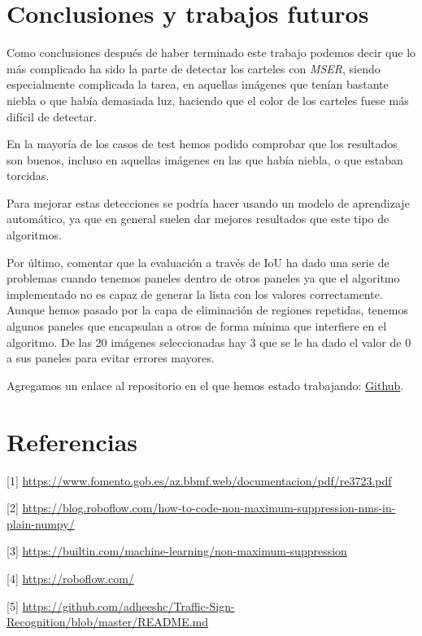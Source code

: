 \documentclass[a4paper, 12pt]{article}
\begin{document}
\section{Conclusiones y trabajos futuros}
Como conclusiones después de haber terminado este trabajo podemos decir que lo más complicado ha sido la parte de detectar los carteles con \textit{MSER}, siendo especialmente complicada la tarea, en aquellas imágenes que tenían bastante niebla o que había demasiada luz, haciendo que el color de los carteles fuese más difícil de detectar. 

En la mayoría de los casos de test hemos podido comprobar que los resultados son buenos, incluso en aquellas imágenes en las que había niebla, o que estaban torcidas.

Para mejorar estas detecciones se podría hacer usando un modelo de aprendizaje automático, ya que en general suelen dar mejores resultados que este tipo de algoritmos. 

Por último, comentar que la evaluación a través de IoU ha dado una serie de problemas cuando tenemos paneles dentro de otros paneles ya que el algoritmo implementado no es capaz de generar la lista con los valores correctamente. Aunque hemos pasado por la capa de eliminación de regiones repetidas, tenemos algunos paneles que encapsulan a otros de forma mínima que interfiere en el algoritmo. De las 20 imágenes seleccionadas hay 3 que se le ha dado el valor de 0 a sus paneles para evitar errores mayores.

Agregamos un enlace al repositorio en el que hemos estado trabajando: \href{https://github.com/Im-Lewis/Practica1-VA}{Github}.

\section{Referencias}
[1] \href{https://www.fomento.gob.es/az.bbmf.web/documentacion/pdf/re3723.pdf}{https://www.fomento.gob.es/az.bbmf.web/documentacion/pdf/re3723.pdf}

[2] \href{https://blog.roboflow.com/how-to-code-non-maximum-suppression-nms-in-plain-numpy/}{https://blog.roboflow.com/how-to-code-non-maximum-suppression-nms-in-plain-numpy/}

[3] \href{https://builtin.com/machine-learning/non-maximum-suppression}{https://builtin.com/machine-learning/non-maximum-suppression}

[4] \href{https://roboflow.com/}{https://roboflow.com/}

[5] \href{https://github.com/adheeshc/Traffic-Sign-Recognition/blob/master/README.md}{https://github.com/adheeshc/Traffic-Sign-Recognition/blob/master/README.md}
\end{document}
